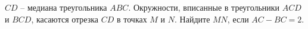 \begin{ex}
	\begin{condition}
		\( CD \) – медиана треугольника \( ABC \). Окружности, вписанные в треугольники \( ACD  \) и \( BCD \), касаются отрезка \( CD \) в точках \( M  \) и \( N  \). Найдите \( MN  \), если \( AC-BC = 2 \).
	\end{condition}
\end{ex}